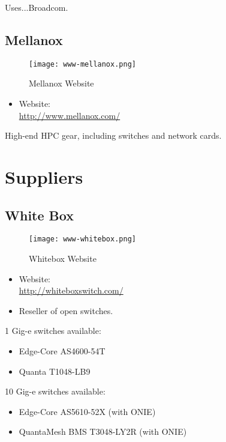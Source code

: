 Uses...Broadcom.


\subsection{Mellanox}
\begin{figure}[h!]
\texttt{[image: www-mellanox.png]}
 \caption{Mellanox Website}
 \label{fig:www-mellanox}
\end{figure}


\begin{itemize}
 \item Website: \\ \url{http://www.mellanox.com/}
\end{itemize}


High-end HPC gear, including switches and network cards.


\section{Suppliers}

\subsection{White Box}
\begin{figure}[h!]
\texttt{[image: www-whitebox.png]}
 \caption{Whitebox Website}
 \label{fig:www-whitebox}
\end{figure}


\begin{itemize}
 \item Website: \\ \url{http://whiteboxswitch.com/}
 \item Reseller of open switches.
\end{itemize}


1 Gig-e switches available:
\begin{itemize}
 \item Edge-Core AS4600-54T
 \item Quanta T1048-LB9
\end{itemize}


10 Gig-e switches available:
\begin{itemize}
 \item Edge-Core AS5610-52X (with ONIE)
 \item QuantaMesh BMS T3048-LY2R (with ONIE)
\end{itemize}


